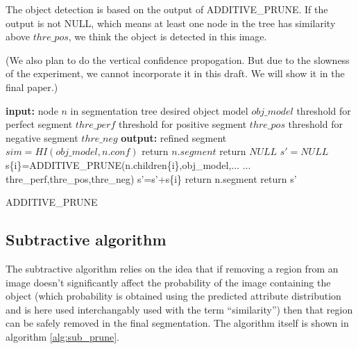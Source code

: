 \documentclass[10pt,twocolumn,letterpaper]{article}
\begin{document}
The object detection is based on the output of ADDITIVE\_PRUNE. If the output is not NULL, which means at least one node in the tree has similarity above $thre\_pos$, we think the object is detected in this image.

(We also plan to do the vertical confidence propogation. But due to the slowness of the experiment, we cannot incorporate it in this draft. We will show it in the final paper.)


\begin{algorithm}
\begin{algorithmic}
  \STATE \textbf{input:}
  \STATE \hspace{3 mm} node $n$ in segmentation tree
  \STATE \hspace{3 mm} desired object model $obj\_model$
  \STATE \hspace{3 mm} threshold for perfect segment $thre\_perf$
  \STATE \hspace{3 mm} threshold for positive segment $thre\_pos$
  \STATE \hspace{3 mm} threshold for negative segment $thre\_neg$
  \STATE \textbf{output:}
  \STATE \hspace{3 mm} refined segment
  \STATE
  \STATE $sim=HI(obj\_model,n.conf)$
    \STATE return $n.segment$
  \ENDIF
    \STATE return $NULL$
  \ENDIF
  \STATE $s'=NULL$
    \STATE s\{i\}=ADDITIVE\_PRUNE(n.children\{i\},obj\_model,...
    \STATE ... thre\_perf,thre\_pos,thre\_neg)
    \STATE s'=s'+s\{i\}
  \ENDFOR
    \STATE return n.segment
  \ELSE
    \STATE return s'
  \ENDIF
\end{algorithmic}
\caption{ADDITIVE\_PRUNE}
\label{alg:add_prune}
\end{algorithm}



\subsection{Subtractive algorithm}
\label{sec:sub}

The subtractive algorithm relies on the idea that if removing a region from
an image doesn't significantly affect the probability of the image containing
the object (which probability is obtained using the predicted attribute
distribution and is here used interchangably used with the term ``similarity'')
then that region can be safely removed in the final segmentation.
The algorithm itself is shown in algorithm \ref{alg:sub_prune}.
\end{document}
